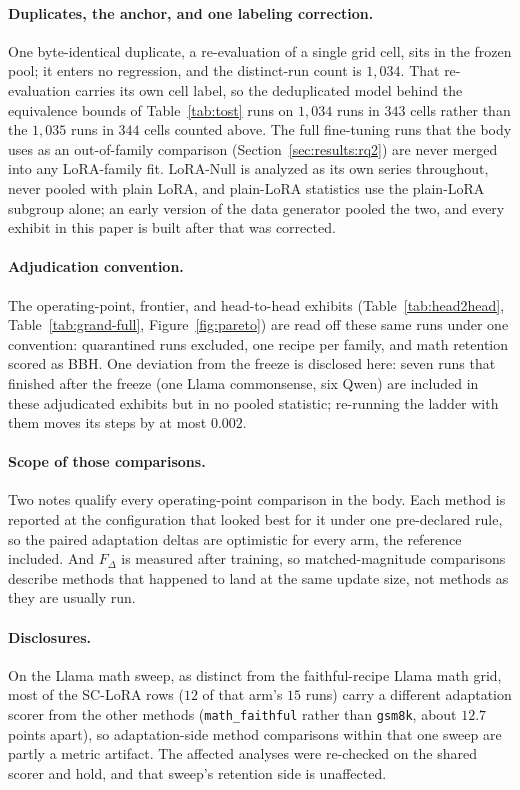 \documentclass[11pt]{article}
\newcommand{\dw}{F_{\Delta}}
\begin{document}
\paragraph{Duplicates, the anchor, and one labeling correction.} One
byte-identical duplicate, a re-evaluation of a single grid cell, sits in the
frozen pool; it enters no regression, and the distinct-run count is $1{,}034$.
That re-evaluation carries its own cell label, so the deduplicated model behind
the equivalence bounds of Table~\ref{tab:tost} runs on $1{,}034$ runs in $343$
cells rather than the $1{,}035$ runs in $344$ cells counted above. The
full fine-tuning runs that the body uses as an out-of-family comparison
(Section~\ref{sec:results:rq2}) are never merged into any LoRA-family fit.
LoRA-Null is analyzed as its own series throughout, never pooled with plain
LoRA, and plain-LoRA statistics use the plain-LoRA subgroup alone; an early
version of the data generator pooled the two, and every exhibit in this paper
is built after that was corrected.

\paragraph{Adjudication convention.} The operating-point, frontier, and
head-to-head exhibits (Table~\ref{tab:head2head},
Table~\ref{tab:grand-full}, Figure~\ref{fig:pareto}) are read off these same
runs under one convention: quarantined runs excluded, one recipe per family,
and math retention scored as BBH. One deviation from the freeze is disclosed
here: seven runs that finished after the freeze (one Llama commonsense, six
Qwen) are included in these adjudicated exhibits but in no pooled statistic;
re-running the ladder with them moves its steps by at most $0.002$.

\paragraph{Scope of those comparisons.} Two notes qualify every
operating-point comparison in the body. Each method is reported at the
configuration that looked best for it under one pre-declared rule, so the
paired adaptation deltas are optimistic for every arm, the reference included.
And $\dw$ is measured after training, so matched-magnitude comparisons
describe methods that happened to land at the same update size, not methods as
they are usually run.

\paragraph{Disclosures.} On the Llama math sweep, as distinct from the
faithful-recipe Llama math grid, most of the SC-LoRA rows ($12$ of that arm's
$15$ runs) carry
a different adaptation scorer from the other methods (\texttt{math\_faithful}
rather than \texttt{gsm8k}, about $12.7$ points apart), so adaptation-side
method comparisons within that one sweep are partly a metric artifact. The
affected analyses were re-checked on the shared scorer and hold, and that
sweep's retention side is unaffected.
\end{document}
